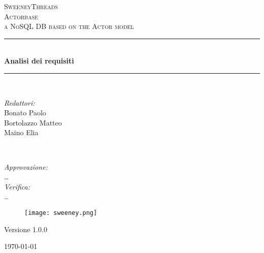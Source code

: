 \documentclass[a4paper]{report}
\begin{document}
	
	\begin{titlepage}
		\newcommand{\HRule}{\rule{\linewidth}{0.5mm}} 
		\center  
		
		\textsc{\LARGE SweeneyThreads}\\[1.5cm] 
		\textsc{\Large Actorbase}\\[0.5cm] 
		\textsc{\large a NoSQL DB based on the Actor model}\\[0.5cm]
		
		
		\HRule \\[0.4cm]
		{ \huge \bfseries Analisi dei requisiti}\\[0.4cm] 
		\HRule \\[1.5cm]
		
		\begin{minipage}{0.4\textwidth}
			\begin{flushleft} \large
				\emph{Redattori:}\\
				Bonato Paolo \\
				Bortolazzo Matteo \\
				Maino Elia
			\end{flushleft}
		\end{minipage}
		~
		\begin{minipage}{0.4\textwidth}
			\begin{flushright} \large
				\emph{Approvazione:} \\
				\dots \\
				\emph{Verifica:} \\
				\dots
			\end{flushright}
		\end{minipage}
		
		\begin{figure}[H]
			\centering
			\texttt{[image: sweeney.png]}
		\end{figure}
		\begin{center}
			Versione 1.0.0
		\end{center}
		{\large \today}\\[3cm] 
		\vfill  
	\end{titlepage}
	
	
	\tableofcontents
	
\end{document}
